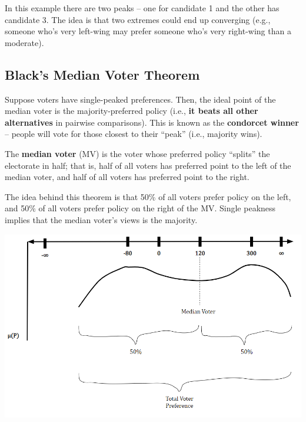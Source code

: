 \documentclass[letterpaper]{article}
\begin{document}
In this example there are two peaks -- one for candidate 1 and the other has candidate 3. The idea is that two extremes could end up converging (e.g., someone who's very left-wing may prefer someone who's very right-wing than a moderate).

\subsection{Black's Median Voter Theorem}
Suppose voters have single-peaked preferences. Then, the ideal point of the median voter is the majority-preferred policy (i.e., \textbf{it beats all other alternatives} in pairwise comparisons). This is known as the \textbf{condorcet winner} -- people will vote for those closest to their ``peak'' (i.e., majority wins).

\bigskip 

The \textbf{median voter} (MV) is the voter whose preferred policy ``splits'' the electorate in half; that is, half of all voters has preferred point to the left of the median voter, and half of all voters has preferred point to the right. 

\bigskip 

The idea behind this theorem is that 50\% of all voters prefer policy on the left, and 50\% of all voters prefer policy on the right of the MV. Single peakness implies that the median voter's views is the majority. 
\begin{center}
    \includegraphics[scale=0.7]{assets/black_thm_proof.png}
\end{center}
\end{document}
